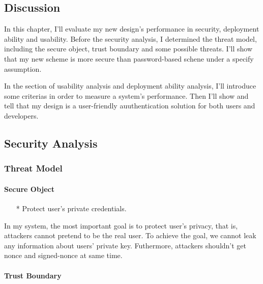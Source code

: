 \begin{CJK}{Bg5}{bsmi}


\chapter{Discussion}

In this chapter, I'll evaluate my new design's performance in security, deployment ability and usability. Before the security analysis, I determined the threat model, including the secure object, trust boundary and some possible threats. I'll show that my new scheme is more secure than password-based schene under a specify assumption.

In the section of usability analysis and deployment ability analysis, I'll introduce some criterias in order to measure a system's performance. Then I'll show and tell that my design is a user-friendly auuthentication solution for both users and developers.

\section{Security Analysis}

\subsection{Threat Model}

\subsubsection{Secure Object}

\begin{enumerate}
\item[*] Protect user's private credentials.
\end{enumerate}

In my system, the most important goal is to protect user's privacy, that is, attackers cannot pretend to be the real user. To achieve the goal, we cannot leak any information about users' private key. Futhermore, attackers shouldn't get nonce and signed-nonce at same time.

\subsubsection{Trust Boundary}


\end{CJK}
